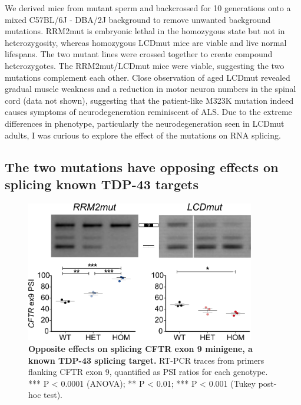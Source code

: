 We derived mice from mutant sperm and backcrossed for 10 generations onto a mixed C57BL/6J - DBA/2J background to remove unwanted background mutations.
RRM2mut is embryonic lethal in the homozygous state but not in heterozygosity, whereas homozygous LCDmut mice are viable and live normal lifespans. 
The two mutant lines were crossed together to create compound heterozygotes.
The RRM2mut/LCDmut mice were viable, suggesting the two mutations complement each other.
Close observation of aged LCDmut revealed gradual muscle weakness and a reduction in motor neuron numbers in the spinal cord (data not shown), suggesting that the patient-like M323K mutation indeed causes symptoms of neurodegeneration reminiscent of ALS. 
Due to the extreme differences in phenotype, particularly the neurodegeneration seen in LCDmut adults, I was curious to explore the effect of the mutations on RNA splicing.

\subsection{The two mutations have opposing effects on splicing known TDP-43 targets}

\begin{figure}[h!]
	\centering
	\includegraphics[width=10cm]{Figures/05_tdp_mice/CFTR.png}
	\caption[Opposite effects on splicing CFTR exon 9 minigene, a known TDP-43 splicing target]{
		\textbf{Opposite effects on splicing CFTR exon 9 minigene, a known TDP-43 splicing target.}
	RT-PCR traces from primers flanking CFTR exon 9, quantified as PSI ratios for each genotype. *** P < 0.0001 (ANOVA); ** P < 0.01; *** P < 0.001 (Tukey post-hoc test).
	}	
	\label{fig:CFTR}
\end{figure}

